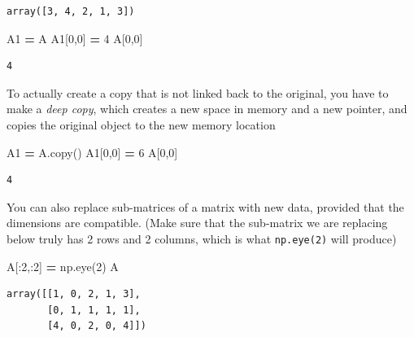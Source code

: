 \documentclass[
  letterpaper,
]{scrbook}
\newenvironment{Shaded}{\begin{snugshade}}{\end{snugshade}}
\newcommand{\DecValTok}[1]{\textcolor[rgb]{0.00,0.00,0.81}{#1}}
\newcommand{\NormalTok}[1]{#1}
\newcommand{\OperatorTok}[1]{\textcolor[rgb]{0.81,0.36,0.00}{\textbf{#1}}}
\begin{document}
\begin{verbatim}
array([3, 4, 2, 1, 3])
\end{verbatim}

\begin{Shaded}
\begin{Highlighting}[]
\NormalTok{A1 }\OperatorTok{=}\NormalTok{ A}
\NormalTok{A1[}\DecValTok{0}\NormalTok{,}\DecValTok{0}\NormalTok{] }\OperatorTok{=} \DecValTok{4}
\NormalTok{A[}\DecValTok{0}\NormalTok{,}\DecValTok{0}\NormalTok{]}
\end{Highlighting}
\end{Shaded}

\begin{verbatim}
4
\end{verbatim}

To actually create a copy that is not linked back to the original, you have to make a \emph{deep copy}, which creates a new space in memory and a new pointer, and copies the original object to the new memory location

\begin{Shaded}
\begin{Highlighting}[]
\NormalTok{A1 }\OperatorTok{=}\NormalTok{ A.copy()}
\NormalTok{A1[}\DecValTok{0}\NormalTok{,}\DecValTok{0}\NormalTok{] }\OperatorTok{=} \DecValTok{6}
\NormalTok{A[}\DecValTok{0}\NormalTok{,}\DecValTok{0}\NormalTok{]}
\end{Highlighting}
\end{Shaded}

\begin{verbatim}
4
\end{verbatim}

You can also replace sub-matrices of a matrix with new data, provided that the dimensions are compatible. (Make sure that the sub-matrix we are replacing below truly has 2 rows and 2 columns, which is what \texttt{np.eye(2)} will produce)

\begin{Shaded}
\begin{Highlighting}[]
\NormalTok{A[:}\DecValTok{2}\NormalTok{,:}\DecValTok{2}\NormalTok{] }\OperatorTok{=}\NormalTok{ np.eye(}\DecValTok{2}\NormalTok{)}
\NormalTok{A}
\end{Highlighting}
\end{Shaded}

\begin{verbatim}
array([[1, 0, 2, 1, 3],
       [0, 1, 1, 1, 1],
       [4, 0, 2, 0, 4]])
\end{verbatim}
\end{document}
